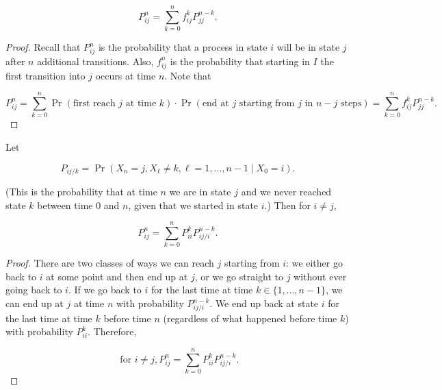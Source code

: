 \begin{proposition}

\[
P_{ij}^n =   \sum_{k=0}^n f_{ij}^k P_{jj}^{n-k}.
\]

\end{proposition}

\begin{proof} Recall that \(P_{ij}^n\) is the probability that a process in state \(i\) will be in state \(j\) after \(n\) additional transitions. Also, \(f_{ij}^n\) is the probability that starting in \(I\) the first transition into \(j\) occurs at time \(n\). Note that

\[
P_{ij}^n =  \sum_{k=0}^n \Pr(\text{first reach } j \text{ at time } k) \cdot \Pr(\text{end at } j \text{ starting from } j \text{ in } n-j \text{ steps}) = \sum_{k=0}^n f_{ij}^k P_{jj}^{n-k}.
\]


\end{proof}

\begin{proposition} Let

\[
P_{ij/k} = \Pr(X_n = j, X_\ell \neq k, \ell = 1, \ldots, n-1 \mid X_0 = i).
\]

(This is the probability that at time \(n\) we are in state \(j\) and we never reached state \(k\) between time 0 and \(n\), given that we started in state \(i\).) Then for \( i \neq j\), 

\[
P_{ij}^n = \sum_{k=0}^n P_{ii}^k P_{ij/i}^{n-k}.
\]

\end{proposition}

\begin{proof} There are two classes of ways we can reach \(j\) starting from \(i\): we either go back to \(i\) at some point and then end up at \(j\), or we go straight to \(j\) without ever going back to \(i\). If we go back to \(i\) for the last time at time \(k  \in \{1, \ldots, n-1\}\), we can end up at \(j\) at time \(n\) with probability \(P_{ij/i}^{n-k}\). We end up back at state \(i\) for the last time at time \(k\) before time \(n\) (regardless of what happened before time \(k\)) with probability \(P_{ii}^k\). Therefore,

\[
 \text{ for } i \neq j, P_{ij}^n = \sum_{k=0}^n P_{ii}^k P_{ij/i}^{n-k}.
\]

\end{proof}


